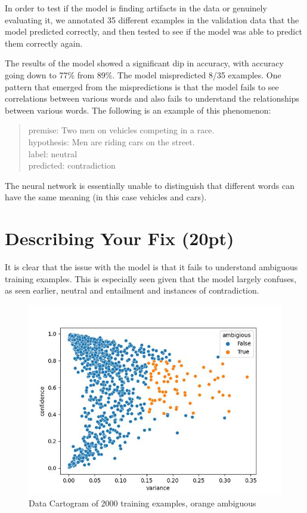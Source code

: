 \documentclass[twocolumn]{article}
\begin{document}
In order to test if the model is finding artifacts in the data or genuinely
evaluating it, we annotated 35 different examples in the validation data that
the model predicted correctly, and then tested to see if the model was able to
predict them correctly again.

The results of the model showed a significant dip in accuracy, with accuracy
going down to 77\% from 89\%. The model mispredicted 8/35 examples. One pattern
that emerged from the mispredictions is that the model fails to see correlations
between various words and also fails to understand the relationships between
various words. The following is an example of this phenomenon: \\

\begin{quote}
premise: Two men on vehicles competing in a race. \\
hypothesis: Men are riding cars on the street. \\
label: neutral \\
predicted: contradiction
\end{quote}

The neural network is essentially unable to distinguish that different words can
have the same meaning (in this case vehicles and cars).

\section{Describing Your Fix (20pt)}

It is clear that the issue with the model is that it fails to understand
ambiguous training examples. This is especially seen given that the model
largely confuses, as seen earlier, neutral and entailment and instances of
contradiction. 


\begin{figure}
  \includegraphics[width=\linewidth]{./ambiguous.jpg}
  \caption{Data Cartogram of 2000 training examples, orange ambiguous}
  \label{}
\end{figure}
\end{document}
